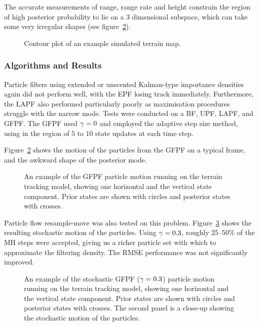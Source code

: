 \documentclass[12pt]{article}
\begin{document}
The accurate measurements of range, range rate and height constrain the region of high posterior probability to lie on a $3$ dimensional subspace, which can take some very irregular shapes (see figure~\ref{fig:drone_example_frame_deterministic}).
%
\begin{figure}
\centering

\caption{Contour plot of an example simulated terrain map.}
\label{fig:drone_terrain_map}
\end{figure}

\subsubsection{Algorithms and Results}

Particle filters using extended or unscented Kalman-type importance densities again did not perform well, with the EPF losing track immediately. Furthermore, the LAPF also performed particularly poorly as maximisation procedures struggle with the narrow mode. Tests were conducted on a BF, UPF, LAPF, and GFPF. The GFPF used $\gamma=0$ and employed the adaptive step size method, using in the region of $5$ to $10$ state updates at each time step.

Figure~\ref{fig:drone_example_frame_deterministic} shows the motion of the particles from the GFPF on a typical frame, and the awkward shape of the posterior mode.
%
\begin{figure}
\centering

\caption{An example of the GFPF particle motion running on the terrain tracking model, showing one horizontal and the vertical state component. Prior states are shown with circles and posterior states with crosses.}
\label{fig:drone_example_frame_deterministic}
\end{figure}

Particle flow resample-move was also tested on this problem. Figure~\ref{fig:drone_example_frame_stochastic} shows the resulting stochastic motion of the particles. Using $\gamma=0.3$, roughly $25$--$50\%$ of the MH steps were accepted, giving us a richer particle set with which to approximate the filtering density. The RMSE performance was not significantly improved.
%
\begin{figure}
\centering
\subfloat[]{}
\subfloat[]{}
\caption{An example of the stochastic GFPF ($\gamma=0.3$) particle motion running on the terrain tracking model, showing one horizontal and the vertical state component. Prior states are shown with circles and posterior states with crosses. The second panel is a close-up showing the stochastic motion of the particles.}
\label{fig:drone_example_frame_stochastic}
\end{figure}
\end{document}
